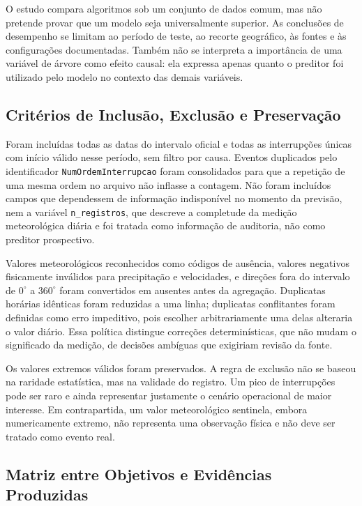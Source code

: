 O estudo compara algoritmos sob um conjunto de dados comum, mas não pretende provar que um modelo seja universalmente superior. As conclusões de desempenho se limitam ao período de teste, ao recorte geográfico, às fontes e às configurações documentadas. Também não se interpreta a importância de uma variável de árvore como efeito causal: ela expressa apenas quanto o preditor foi utilizado pelo modelo no contexto das demais variáveis.

\subsection{Critérios de Inclusão, Exclusão e Preservação}

Foram incluídas todas as datas do intervalo oficial e todas as interrupções únicas com início válido nesse período, sem filtro por causa. Eventos duplicados pelo identificador \texttt{NumOrdemInterrupcao} foram consolidados para que a repetição de uma mesma ordem no arquivo não inflasse a contagem. Não foram incluídos campos que dependessem de informação indisponível no momento da previsão, nem a variável \texttt{n\_registros}, que descreve a completude da medição meteorológica diária e foi tratada como informação de auditoria, não como preditor prospectivo.

Valores meteorológicos reconhecidos como códigos de ausência, valores negativos fisicamente inválidos para precipitação e velocidades, e direções fora do intervalo de $0^\circ$ a $360^\circ$ foram convertidos em ausentes antes da agregação. Duplicatas horárias idênticas foram reduzidas a uma linha; duplicatas conflitantes foram definidas como erro impeditivo, pois escolher arbitrariamente uma delas alteraria o valor diário. Essa política distingue correções determinísticas, que não mudam o significado da medição, de decisões ambíguas que exigiriam revisão da fonte.

Os valores extremos válidos foram preservados. A regra de exclusão não se baseou na raridade estatística, mas na validade do registro. Um pico de interrupções pode ser raro e ainda representar justamente o cenário operacional de maior interesse. Em contrapartida, um valor meteorológico sentinela, embora numericamente extremo, não representa uma observação física e não deve ser tratado como evento real.

\subsection{Matriz entre Objetivos e Evidências Produzidas}

